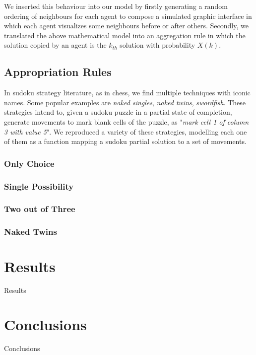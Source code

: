 \documentclass{article}
\begin{document}
We inserted this behaviour into our model by firstly generating a random ordering of neighbours for each agent to compose a simulated graphic interface in which each agent visualizes some neighbours before or after others. Secondly, we translated the above mathematical model into an aggregation rule in which the solution copied by an agent is the $k_{th}$ solution with probability $X(k)$.

\subsection{Appropriation Rules}

In sudoku strategy literature, as in chess, we find multiple techniques with iconic names. Some popular examples are {\em naked singles}, {\em naked twins}, {\em swordfish}. These strategies intend to, given a sudoku puzzle in a partial state of completion, generate movements to mark blank cells of the puzzle, as "{\em mark cell 1 of column 3 with value 5}". We reproduced a variety of these strategies, modelling each one of them as a function mapping a sudoku partial solution to a set of movements.

\subsubsection{Only Choice}

\subsubsection{Single Possibility}

\subsubsection{Two out of Three}

\subsubsection{Naked Twins}

\section{Results}

Results

\section{Conclusions}

Conclusions


\end{document}
